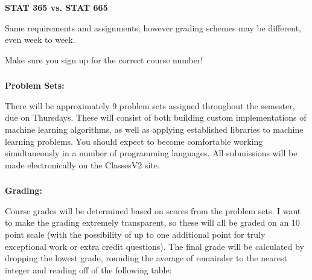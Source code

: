 \documentclass[xetex,mathserif,serif,aspectratio=169]{beamer}
\begin{document}
\begin{frame}[fragile] \frametitle{}  \oldB \small

{\bf STAT 365 vs. STAT 665}

Same requirements and assignments; however grading schemes may be
different, even week to week.

Make sure you sign up for the correct
course number!

\end{frame}

\begin{frame}[fragile] \frametitle{}  \oldB \small

{\bf Problem Sets:}

There will be approximately $9$ problem sets assigned throughout the
semester, due on Thursdays. These will consist of both building custom
implementations of machine learning algorithms, as well as applying
established libraries to machine learning problems.
You should expect to become comfortable working simultaneously in a
number of programming languages. All submissions will be made
electronically on the ClassesV2 site.

\end{frame}

\begin{frame}[fragile] \frametitle{}  \oldB \small

{\bf Grading:}

Course grades will be determined based on scores from the problem
sets. I want to make the grading extremely transparent, so these
will all be graded on an 10 point scale (with the possibility of
up to one additional point for truly exceptional work or extra
credit questions). The final grade will be calculated by dropping
the lowest grade, rounding the average of remainder to the nearest
integer and reading off of the following table:

\end{frame}
\end{document}
